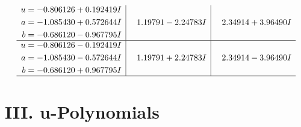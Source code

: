 \documentclass[1p]{elsarticle_modified}
\theoremstyle{definition}
\begin{document}
$$\begin{array}{c|c|c}
\begin{aligned}
u &= -0.806126 + 0.192419 I \\
a &= -1.085430 + 0.572644 I \\
b &= -0.686120 - 0.967795 I\end{aligned}
 & \phantom{-}1.19791 - 2.24783 I & \phantom{-}2.34914 + 3.96490 I \\ \hline\begin{aligned}
u &= -0.806126 - 0.192419 I \\
a &= -1.085430 - 0.572644 I \\
b &= -0.686120 + 0.967795 I\end{aligned}
 & \phantom{-}1.19791 + 2.24783 I & \phantom{-}2.34914 - 3.96490 I\\
 \hline 
 \end{array}$$\newpage
\newpage\renewcommand{\arraystretch}{1}
\centering \section*{ III. u-Polynomials}
\end{document}
